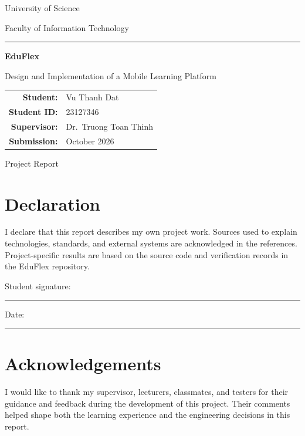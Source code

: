 \documentclass[12pt,a4paper,oneside]{report}
\newcommand{\projectname}{EduFlex}
\newcommand{\university}{University of Science}
\newcommand{\faculty}{Faculty of Information Technology}
\newcommand{\studentname}{Vu Thanh Dat}
\newcommand{\studentid}{23127346}
\newcommand{\supervisor}{Dr.\ Truong Toan Thinh}
\newcommand{\submissiondate}{October 2026}
\begin{document}
\begin{titlepage}
\centering
{\Large \university\par}\vspace{0.4cm}
{\large \faculty\par}\vfill
{\color{eduflexteal}\rule{\textwidth}{1.2pt}\par}\vspace{0.8cm}
{\Huge\bfseries \projectname\par}\vspace{0.35cm}
{\LARGE Design and Implementation of a Mobile Learning Platform\par}
\vspace{0.8cm}{\color{eduflexteal}\rule{\textwidth}{1.2pt}\par}\vfill
\begin{tabular}{rl}
\textbf{Student:} & \studentname \\
\textbf{Student ID:} & \studentid \\
\textbf{Supervisor:} & \supervisor \\
\textbf{Submission:} & \submissiondate
\end{tabular}
\vfill{\large Project Report\par}
\end{titlepage}

\chapter*{Declaration}
I declare that this report describes my own project work. Sources used to explain
technologies, standards, and external systems are acknowledged in the references.
Project-specific results are based on the source code and verification records in
the EduFlex repository.

\vspace{2cm}
\noindent Student signature: \rule{6cm}{0.4pt}\hfill Date: \rule{3cm}{0.4pt}

\chapter*{Acknowledgements}
I would like to thank my supervisor, lecturers, classmates, and testers for their
guidance and feedback during the development of this project. Their comments helped
shape both the learning experience and the engineering decisions in this report.
\end{document}
